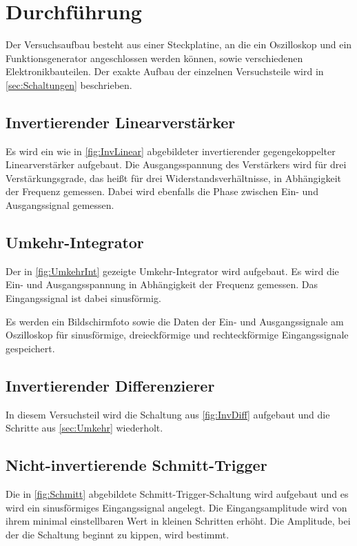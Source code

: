 \section{Durchführung}
Der Versuchsaufbau besteht aus einer Steckplatine, an die ein Oszilloskop und ein Funktionsgenerator angeschlossen werden können, sowie verschiedenen Elektronikbauteilen. Der exakte Aufbau der einzelnen Versuchsteile wird in \autoref{sec:Schaltungen} beschrieben.


\subsection{Invertierender Linearverstärker}
Es wird ein wie in \autoref{fig:InvLinear} abgebildeter invertierender gegengekoppelter Linearverstärker aufgebaut. Die Ausgangsspannung des Verstärkers wird für drei Verstärkungsgrade, das heißt für drei Widerstandsverhältnisse, in Abhängigkeit der Frequenz gemessen. %
Dabei wird ebenfalls die Phase zwischen Ein- und Ausgangssignal gemessen.


\subsection{Umkehr-Integrator}
\label{sec:Umkehr}
Der in \autoref{fig:UmkehrInt} gezeigte Umkehr-Integrator wird aufgebaut.
Es wird die Ein- und Ausgangsspannung in Abhängigkeit der Frequenz gemessen. Das Eingangssignal ist dabei sinusförmig.

Es werden ein Bildschirmfoto sowie die Daten der Ein- und Ausgangssignale am Oszilloskop für sinusförmige, dreieckförmige und rechteckförmige Eingangssignale gespeichert.



\subsection{Invertierender Differenzierer}
In diesem Versuchsteil wird die Schaltung aus \autoref{fig:InvDiff} aufgebaut und die Schritte aus \autoref{sec:Umkehr} wiederholt.



\subsection{Nicht-invertierende Schmitt-Trigger}
\label{sec:Schmitt}
Die in \autoref{fig:Schmitt} abgebildete Schmitt-Trigger-Schaltung wird aufgebaut und es wird ein sinusförmiges Eingangssignal angelegt. Die Eingangsamplitude wird von ihrem minimal einstellbaren Wert in kleinen Schritten erhöht.
Die Amplitude, bei der die Schaltung beginnt zu kippen, wird bestimmt.

